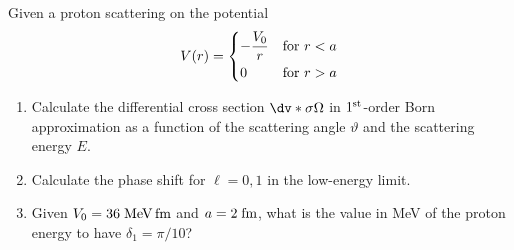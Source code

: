 \begin{esercizio}
   Given a proton scattering on the potential
   \begin{equation*}
      V(r)=
      \begin{dcases}
         -\frac{V_0}{r} & \text{for } r<a\\
         0 & \text{for } r>a
      \end{dcases}
   \end{equation*}
   \begin{enumerate}[label=\alph*), leftmargin=0.6cm]
      \item Calculate the differential cross section $\dv*{\sigma}{\Omega}$ in $1^{\rm st}$-order Born approximation as a function of the scattering angle $\vartheta$ and the scattering energy $E$.
      \item Calculate the phase shift for $\ell=0,1$ in the low-energy limit.
      \item Given $V_0=36 \; \rm MeV \, fm$ and $a=2 \; \rm fm$, what is the value in MeV of the proton energy to have $\delta_1=\pi/10$?
   \end{enumerate}
\end{esercizio}
